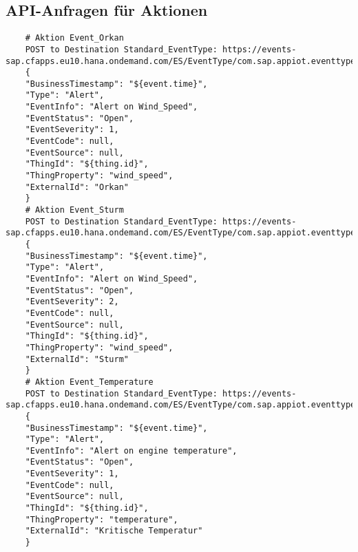 \subsection{API-Anfragen für Aktionen}

\begin{lstlisting}
    # Aktion Event_Orkan
    POST to Destination Standard_EventType: https://events-sap.cfapps.eu10.hana.ondemand.com/ES/EventType/com.sap.appiot.eventtypes:StandardEventType/v1/Events
    {
	"BusinessTimestamp": "${event.time}",
	"Type": "Alert",
	"EventInfo": "Alert on Wind_Speed",
	"EventStatus": "Open",
	"EventSeverity": 1,
	"EventCode": null,
	"EventSource": null,
	"ThingId": "${thing.id}",
	"ThingProperty": "wind_speed",
	"ExternalId": "Orkan"
    }
    # Aktion Event_Sturm
    POST to Destination Standard_EventType: https://events-sap.cfapps.eu10.hana.ondemand.com/ES/EventType/com.sap.appiot.eventtypes:StandardEventType/v1/Events
    {
	"BusinessTimestamp": "${event.time}",
	"Type": "Alert",
	"EventInfo": "Alert on Wind_Speed",
	"EventStatus": "Open",
	"EventSeverity": 2,
	"EventCode": null,
	"EventSource": null,
	"ThingId": "${thing.id}",
	"ThingProperty": "wind_speed",
	"ExternalId": "Sturm"
    }
    # Aktion Event_Temperature
    POST to Destination Standard_EventType: https://events-sap.cfapps.eu10.hana.ondemand.com/ES/EventType/com.sap.appiot.eventtypes:StandardEventType/v1/Events
    {
	"BusinessTimestamp": "${event.time}",
	"Type": "Alert",
	"EventInfo": "Alert on engine temperature",
	"EventStatus": "Open",
	"EventSeverity": 1,
	"EventCode": null,
	"EventSource": null,
	"ThingId": "${thing.id}",
	"ThingProperty": "temperature",
	"ExternalId": "Kritische Temperatur"
    }
\end{lstlisting}

